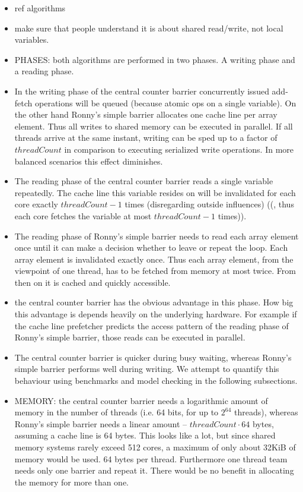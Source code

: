 \documentclass[a4paper, 10pt]{article}
\begin{document}
\begin{itemize}
	\item ref algorithms
	\item make sure that people understand it is about shared read/write, not local variables.
	\item PHASES: both algorithms are performed in two phases. A writing phase and a reading phase.
	\item In the writing phase of the central counter barrier concurrently issued add-fetch operations will be queued (because atomic ops on a single variable). On the other hand Ronny's simple barrier allocates one cache line per array element. Thus all writes to shared memory can be executed in parallel. If all threads arrive at the same instant, writing can be sped up to a factor of $\mathit{threadCount}$ in comparison to executing serialized write operations. In more balanced scenarios this effect diminishes.
	\item The reading phase of the central counter barrier reads a single variable repeatedly. The cache line this variable resides on will be invalidated for each core exactly $\mathit{threadCount} - 1$ times (disregarding outside influences) ((, thus each core fetches the variable at most $\mathit{threadCount} - 1$ times)).
	\item The reading phase of Ronny's simple barrier needs to read each array element once until it can make a decision whether to leave or repeat the loop. Each array element is invalidated exactly once. Thus each array element, from the viewpoint of one thread, has to be fetched from memory at most twice. From then on it is cached and quickly accessible.
	\item the central counter barrier has the obvious advantage in this phase. How big this advantage is depends heavily on the underlying hardware. For example if the cache line prefetcher predicts the access pattern of the reading phase of Ronny's simple barrier, those reads can be executed in parallel.
	\item The central counter barrier is quicker during busy waiting, whereas Ronny's simple barrier performs well during writing. We attempt to quantify this behaviour using benchmarks and model checking in the following subsections.
	\item MEMORY: the central counter barrier needs a logarithmic amount of memory in the number of threads (i.e. 64 bits, for up to $2^{64}$ threads), whereas Ronny's simple barrier needs a linear amount -- $\mathit{threadCount} \cdot 64$ bytes, assuming a cache line is 64 bytes. This looks like a lot, but since shared memory systems rarely exceed 512 cores, a maximum of only about 32KiB of memory would be used. 64 bytes per thread. Furthermore one thread team needs only one barrier and repeat it. There would be no benefit in allocating the memory for more than one.
\end{itemize}
\end{document}

